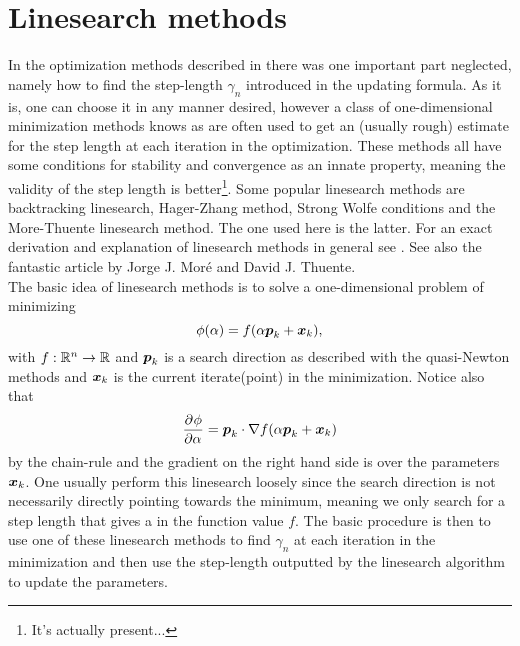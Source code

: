 \section{Linesearch methods\label{sec:linesearch_methods}}
    In the optimization methods described in
     there was one important
    part neglected, namely how to find the step-length $\gamma_n$ introduced in
    the updating formula. As it is, one can choose it in any manner desired,
    however a class of one-dimensional minimization methods knows as
     are often used to get an (usually rough)
    estimate for the step length at each iteration in the optimization. These
    methods all have some conditions for stability and convergence as an innate
    property, meaning the validity of the step length is better\footnote{It's
    actually present...}. Some popular linesearch methods are backtracking
    linesearch, Hager-Zhang method, Strong Wolfe conditions and the
    More-Thuente linesearch method. The one used here is the latter.  For an
    exact derivation and explanation of linesearch methods in general see
    \cite{numOptNocWrig}. See also the fantastic article by Jorge J.  Mor{\'e}
    and David J. Thuente\cite{moreThuenteArticle}. \\
    The basic idea of linesearch methods is to solve a one-dimensional problem
    of minimizing
        \begin{equation}
            \phi(\alpha) = f(\alpha \boldsymbol{{p}}_k + \boldsymbol{{x}}_k),
        \end{equation}
    with $f:\mathbb{R}^n\rightarrow\mathbb{R}$ and $\boldsymbol{{p}}_k$ is a search direction
    as described with the quasi-Newton methods and $\boldsymbol{{x}}_k$ is the current
    iterate(point) in the minimization. Notice also that
        \begin{equation}
            \prd{\alpha}[\phi] = \blds{p}_k \cdot \nabla f(\alpha \blds{p}_k +
            \blds{x}_k)
        \end{equation}
    by the chain-rule and the gradient on the right hand side is over the
    parameters $\boldsymbol{{x}}_k$. One usually perform this linesearch loosely since
    the search direction is not necessarily directly pointing towards the
    minimum, meaning we only search for a step length that gives a
     in the function value $f$. The basic procedure
    is then to use one of these linesearch methods to find $\gamma_n$ at each
    iteration in the minimization and then use the step-length outputted by the
    linesearch algorithm to update the parameters.

